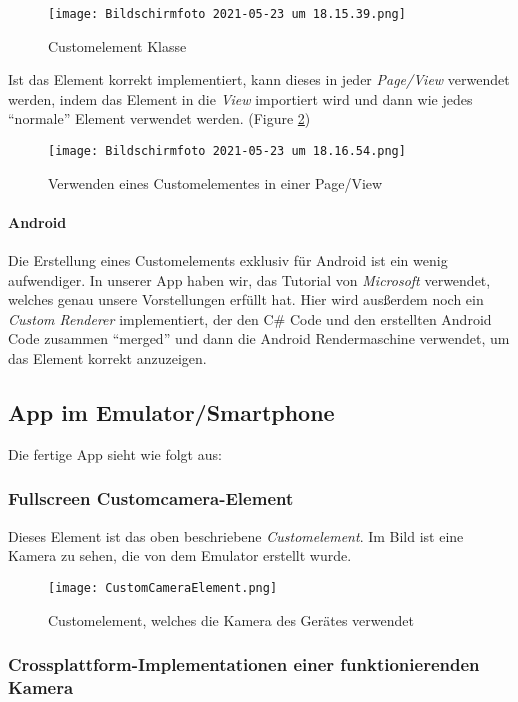 \begin{figure}[hbt!]
    \centering
    \texttt{[image: Bildschirmfoto 2021-05-23 um 18.15.39.png]}
    \caption{Customelement Klasse}
    \label{fig:CustomelementCS}
\end{figure} 

Ist das Element korrekt implementiert, kann dieses in jeder \textit{Page/View} verwendet werden, indem das Element
in die \textit{View} importiert wird und dann wie jedes "`normale"' Element verwendet werden. (Figure \ref{fig:UsingCustomElement})

\begin{figure}[hbt!]
    \centering
    \texttt{[image: Bildschirmfoto 2021-05-23 um 18.16.54.png]}
    \caption{Verwenden eines Customelementes in einer Page/View}
    \label{fig:UsingCustomElement}
\end{figure}
\paragraph{Android} 
 Die Erstellung eines Customelements exklusiv für Android ist ein wenig aufwendiger. In unserer App haben wir, das Tutorial von 
\textit{Microsoft} verwendet, welches genau unsere Vorstellungen erfüllt hat. Hier wird ausßerdem noch ein \textit{Custom Renderer} implementiert, der
den C\# Code und den erstellten Android Code zusammen "`merged"' und dann die Android Rendermaschine verwendet, um das Element korrekt anzuzeigen.

\subsection{App im Emulator/Smartphone}
Die fertige App sieht wie folgt aus:

\subsubsection{Fullscreen Customcamera-Element}
Dieses Element ist das oben beschriebene \textit{Customelement}.
Im Bild ist eine Kamera zu sehen, die von dem Emulator erstellt wurde.
\begin{figure}[hbt!]
    \centering
    \texttt{[image: CustomCameraElement.png]}
    \caption{Customelement, welches die Kamera des Gerätes verwendet}
\end{figure}
\subsubsection{Crossplattform-Implementationen einer funktionierenden Kamera}
